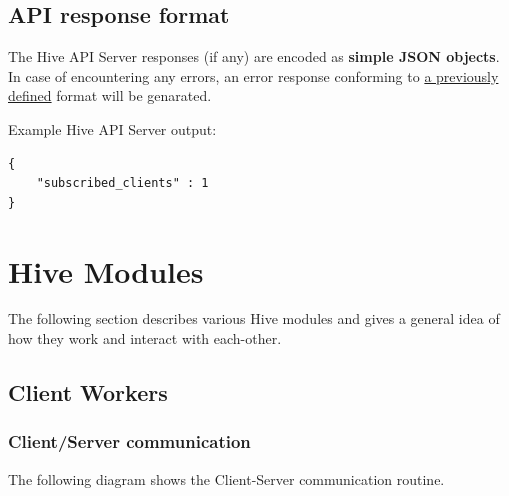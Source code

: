 \documentclass[a4paper]{article}
\begin{document}
\subsection{API response format}
\label{sec-6-2}

The Hive API Server responses (if any) are encoded as \textbf{simple JSON objects}. In case of encountering any errors, an error response conforming to \hyperref[sec-5-4]{a previously defined} format will be genarated.

\noindent
Example Hive API Server output:

\begin{verbatim}
{
    "subscribed_clients" : 1
}
\end{verbatim}




\pagebreak
\section{Hive Modules}
\label{sec-7}

The following section describes various Hive modules and gives a general idea of how they work and interact with each-other.
\subsection{Client Workers}
\label{sec-7-1}
\subsubsection{Client/Server communication}
\label{sec-7-1-1}

The following diagram shows the Client-Server communication routine.
\end{document}
